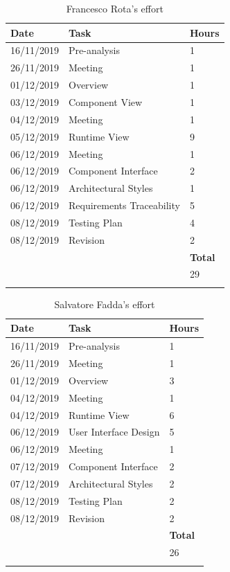 \documentclass{article}
\begin{document}
\begin{longtable}{| p{2 cm} | p{6 cm} | p{1 cm} |} 
			\hline
			{\bf Date} & {\bf Task} & {\bf Hours}\\
			\hline
			16/11/2019 & Pre-analysis & 1 \\
			\hline
			26/11/2019 & Meeting & 1 \\
			\hline
			01/12/2019 & Overview & 1 \\
			\hline
			03/12/2019 & Component View & 1 \\
			\hline
			04/12/2019 & Meeting & 1 \\
			\hline
			05/12/2019 & Runtime View & 9 \\
			\hline
			06/12/2019 & Meeting & 1 \\
			\hline
			06/12/2019 & Component Interface & 2 \\
			\hline
			06/12/2019 & Architectural Styles & 1 \\
			\hline
			06/12/2019 & Requirements Traceability & 5 \\
			\hline
			08/12/2019 & Testing Plan & 4 \\
			\hline
			08/12/2019 & Revision & 2 \\
			\hline
			& & {\bf Total} \\
			\hline
			& & 29 \\
			\hline		
			\caption{Francesco Rota's effort} 

\end{longtable}
\pagebreak

\begin{longtable}{| p{2 cm} | p{6 cm} | p{1 cm} |} 
			\hline
			{\bf Date} & {\bf Task} & {\bf Hours}\\
			\hline
			16/11/2019 & Pre-analysis & 1 \\
			\hline
			26/11/2019 & Meeting & 1 \\
			\hline
			01/12/2019 & Overview & 3 \\
			\hline
			04/12/2019 & Meeting & 1 \\
			\hline
			04/12/2019 & Runtime View & 6 \\
			\hline
			06/12/2019 & User Interface Design & 5 \\
			\hline
			06/12/2019 & Meeting & 1 \\
			\hline
			07/12/2019 & Component Interface & 2 \\
			\hline
			07/12/2019 & Architectural Styles & 2 \\
			\hline
			08/12/2019 & Testing Plan & 2 \\
			\hline
			08/12/2019 & Revision & 2 \\
			\hline
			& & {\bf Total} \\
			\hline
			& & 26 \\
			\hline		
			\caption{Salvatore Fadda's effort} 
\end{longtable}
	
	
\end{document}
